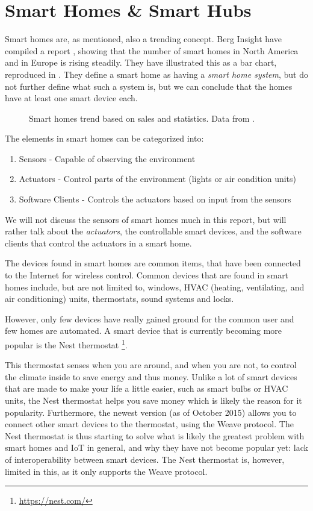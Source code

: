 \section{Smart Homes \& Smart Hubs}\label{sec:smarthomes}
Smart homes are, as mentioned, also a trending concept. 
Berg Insight have compiled a report \cite{SMARTHOMETREND}, 
showing that the number of smart homes in North America and in Europe is rising steadily. 
They have illustrated this as a bar chart, reproduced in .
They define a smart home as having a \emph{smart home system}, 
but do not further define what such a system is, 
but we can conclude that the homes have at least one smart device each. 

\begin{figure}[!htb]
  \centering
  
  \caption{Smart homes trend based on sales and statistics. Data from \protect\cite{SMARTHOMETREND}.}
  \label{fig:smarthomestrend}
\end{figure}

The elements in smart homes can be categorized into:
\begin{enumerate}
  \item Sensors - Capable of observing the environment
  \item Actuators - Control parts of the environment (\eg lights or air condition units)
  \item Software Clients - Controls the actuators based on input from the sensors
\end{enumerate}

We will not discuss the sensors of smart homes much in this report, 
but will rather talk about the \emph{actuators}, 
\ie the controllable smart devices,
and the software clients that control the actuators in a smart home.

The devices found in smart homes are common items, 
that have been connected to the Internet for wireless control.
Common devices that are found in smart homes include, but are not limited to, 
windows, HVAC (heating, ventilating, and air conditioning) units, thermostats, sound systems and locks. 

However, only few devices have really gained ground for the common user and few homes are automated.
A smart device that is currently becoming more popular is the Nest thermostat \footnote{\url{https://nest.com/}}. 

This thermostat senses when you are around, and when you are not, 
to control the climate inside to save energy and thus money.
Unlike a lot of smart devices that are made to make your life a little easier, such as smart bulbs or HVAC units,
the Nest thermostat helps you save money which is likely the reason for it popularity. 
Furthermore, the newest version (as of October 2015) allows you to connect other smart devices to the thermostat, 
using the Weave protocol. 
The Nest thermostat is thus starting to solve what is likely the greatest problem with smart homes and IoT in general, 
and why they have not become popular yet: lack of interoperability between smart devices. 
The Nest thermostat is, however, limited in this, 
as it only supports the Weave protocol. 

